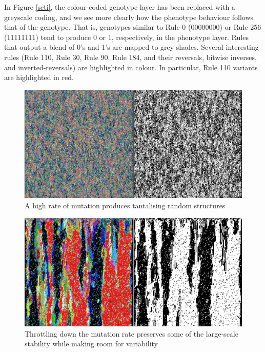 \documentclass{AISB2008}
\begin{document}
In Figure \ref{seti}, the colour-coded genotype layer has been
replaced with a greyscale coding, and we see more clearly how the
phenotype behaviour follows that of the genotype.  That is, genotypes
similar to Rule 0 (00000000) or Rule 256 (11111111) tend to produce 0
or 1, respectively, in the phenotype layer.  Rules that output a blend
of 0's and 1's are mapped to grey shades.  Several interesting rules
(Rule 110, Rule 30, Rule 90, Rule 184, and their reversals, bitwise
inverses, and inverted-reversals) are highlighted in colour.  In
particular, Rule 110 variants are highlighted in red.


\begin{figure}
\includegraphics[width=\columnwidth]{big.png}
\caption{A high rate of mutation produces tantalising random structures \label{random-mutation}}
\end{figure}

\begin{figure}
\includegraphics[width=\columnwidth]{lamp-down-low.png}
\caption{Throttling down the mutation rate preserves some of the large-scale stability while making room for variability \label{lower-rate}}
\end{figure}
\end{document}
